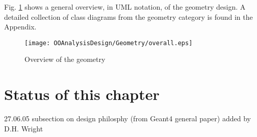 Fig. \ref{figure:geom-1} shows a general overview, in UML notation, of 
the geometry design.  A detailed collection of class diagrams from the 
geometry category is found in the Appendix.

\begin{figure}
\begin{center}
\texttt{[image: OOAnalysisDesign/Geometry/overall.eps]}
\caption{Overview of the geometry}
\label{figure:geom-1}
\end{center}
\end{figure}

\section{Status of this chapter}

27.06.05 subsection on design philosphy (from Geant4 general paper) 
         added by D.H. Wright \\ 
